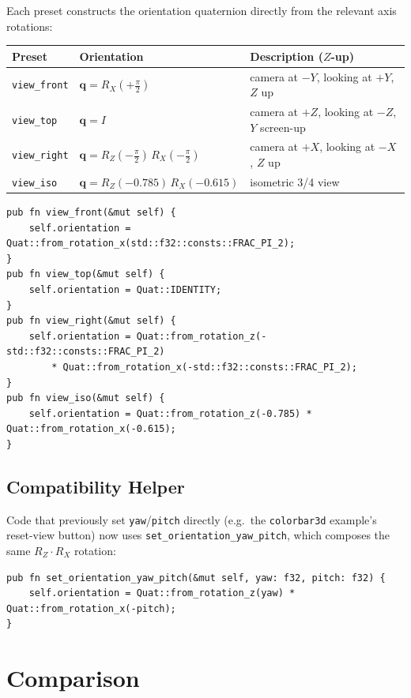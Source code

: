 \documentclass[11pt]{article}
\begin{document}
Each preset constructs the orientation quaternion directly from the
relevant axis rotations:

\begin{center}
\begin{tabular}{lll}
\toprule
Preset & Orientation & Description ($Z$-up) \\
\midrule
\texttt{view\_front} & $\mathbf{q} = R_X(+\tfrac{\pi}{2})$ & camera at $-Y$, looking at $+Y$, $Z$ up \\
\texttt{view\_top}   & $\mathbf{q} = I$ & camera at $+Z$, looking at $-Z$, $Y$ screen-up \\
\texttt{view\_right} & $\mathbf{q} = R_Z(-\tfrac{\pi}{2})\,R_X(-\tfrac{\pi}{2})$ & camera at $+X$, looking at $-X$, $Z$ up \\
\texttt{view\_iso}   & $\mathbf{q} = R_Z(-0.785)\,R_X(-0.615)$ & isometric 3/4 view \\
\bottomrule
\end{tabular}
\end{center}

\begin{lstlisting}
pub fn view_front(&mut self) {
    self.orientation = Quat::from_rotation_x(std::f32::consts::FRAC_PI_2);
}
pub fn view_top(&mut self) {
    self.orientation = Quat::IDENTITY;
}
pub fn view_right(&mut self) {
    self.orientation = Quat::from_rotation_z(-std::f32::consts::FRAC_PI_2)
        * Quat::from_rotation_x(-std::f32::consts::FRAC_PI_2);
}
pub fn view_iso(&mut self) {
    self.orientation = Quat::from_rotation_z(-0.785) * Quat::from_rotation_x(-0.615);
}
\end{lstlisting}

\subsection{Compatibility Helper}

Code that previously set \texttt{yaw}/\texttt{pitch} directly (e.g.\
the \texttt{colorbar3d} example's reset-view button) now uses
\texttt{set\_orientation\_yaw\_pitch}, which composes the same
$R_Z \cdot R_X$ rotation:

\begin{lstlisting}
pub fn set_orientation_yaw_pitch(&mut self, yaw: f32, pitch: f32) {
    self.orientation = Quat::from_rotation_z(yaw) * Quat::from_rotation_x(-pitch);
}
\end{lstlisting}

\section{Comparison}
\end{document}
